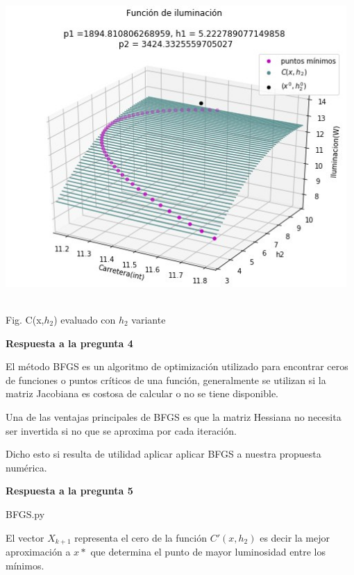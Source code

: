\documentclass[11pt]{article}
\begin{document}
\begin{enumerate}
        	\includegraphics[keepaspectratio, width=13cm]{Imagenes/parte2_2.jpg}
        	\caption{\\Fig. C(x,$h_2$) evaluado con $h_2$ variante \label{fig:grafica4}}

        
        
    \vspace{0.5cm}
    \noindent \textbf{Respuesta a la pregunta 4}
    

    El método BFGS es un algoritmo de optimización utilizado para encontrar ceros de funciones o puntos críticos de una función, generalmente se utilizan si la matriz Jacobiana es costosa de calcular o no se tiene disponible.
    
    Una de las ventajas principales de BFGS es que la matriz Hessiana no necesita ser invertida si no que se aproxima por cada iteración.
    
    Dicho esto si resulta de utilidad aplicar aplicar BFGS a nuestra propuesta numérica.
    
    
    
    \vspace{0.5cm}
    \noindent \textbf{Respuesta a la pregunta 5}
    \begin{tcolorbox}[colframe=blue!35!black, title=Códigos]
BFGS.py
\end{tcolorbox}

    El vector $X_{k+1}$ representa el cero de la función $C'(x,h_2)$ es decir la mejor aproximación a $x*$ que determina el punto de mayor luminosidad entre los mínimos.

\end{enumerate}







\end{document}
